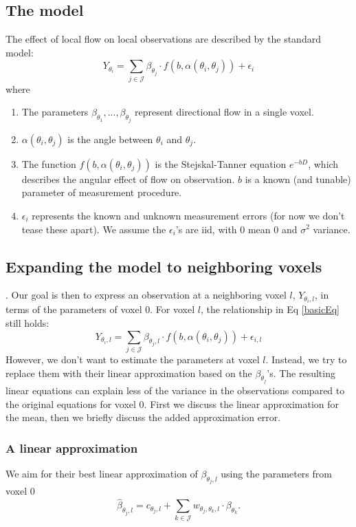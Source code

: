\documentclass[11pt]{amsart}
\newcommand{\tj}{\theta_j}
\newcommand{\ti}{\theta_i}
\newcommand{\tk}{\theta_k}
\newcommand{\yti}{Y_{\theta_i}}
\newcommand{\ytil}{Y_{\theta_i,l}}
\begin{document}
\subsection{The model}
The effect of local flow on local observations are described by the standard model:
\begin{equation}
\yti = \sum_{j \in \mathcal{J}} \beta_{\tj} \cdot f(b, \alpha(\ti, \tj)) + \epsilon_i 
\label{basicEq}
\end{equation}
where 
\begin{enumerate}
\item The parameters $\beta_{\theta_1},...,\beta_{\tj}$ represent directional flow in a single voxel. 
\item $\alpha(\ti, \tj)$ is the angle between $\ti$ and $\tj$.
\item The function $f(b, \alpha(\ti, \tj))$ is the Stejskal-Tanner equation $e^{-b D}$, which describes the 
angular effect of flow on observation.  
$b$ is a known (and tunable) parameter of measurement procedure.   
\item $\epsilon_i $ represents the known and unknown measurement errors (for now we don't 
tease these apart). We assume the $\epsilon_i$'s are iid, with $0$ mean $0$ and $\sigma^2$ variance.
\end{enumerate}

\subsection{Expanding the model to neighboring voxels}.
Our goal is then to express an observation at a neighboring voxel $l$, $\ytil$, in terms of the parameters 
of voxel 0. For voxel $l$, the relationship in Eq \eqref{basicEq} still holds:
\begin{equation}
\ytil = \sum_{j \in \mathcal{J}} \beta_{\tj,l} \cdot f(b, \alpha(\ti, \tj)) + \epsilon_{i,l} 
\label{neighbor}
\end{equation}
However, we don't want to estimate the parameters at voxel $l$.
Instead, we try to replace them with their linear approximation based on the $\beta_{\tj}$'s. 
The resulting linear equations can explain less of the variance in the observations compared to the original
equations for voxel 0. First we discuss the linear approximation for the mean, 
then we briefly discuss the added approximation error. 

\subsubsection{A linear approximation}
We aim for their best linear approximation of $\beta_{\tj,l}$ using the 
parameters from voxel 0
\begin{equation}
\hat{\beta}_{\tj,l} = c_{\tj,l} + \sum_{k\in\mathcal{J}} w_{\tj,\tk, l} \cdot \beta_{\tk}. 
\end{equation} 
\end{document}
